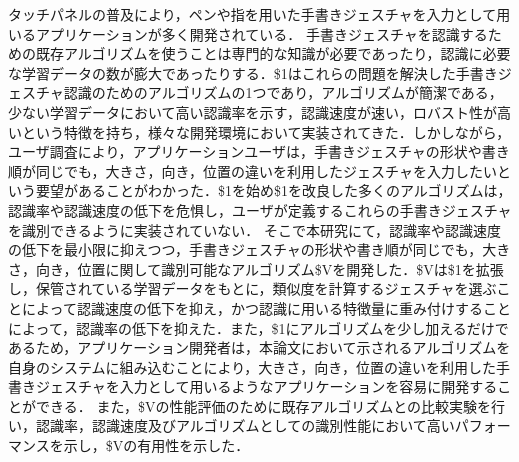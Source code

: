 タッチパネルの普及により，ペンや指を用いた手書きジェスチャを入力として用いるアプリケーションが多く開発されている．
手書きジェスチャを認識するための既存アルゴリズムを使うことは専門的な知識が必要であったり，認識に必要な学習データの数が膨大であったりする．\$1はこれらの問題を解決した手書きジェスチャ認識のためのアルゴリズムの1つであり，アルゴリズムが簡潔である，少ない学習データにおいて高い認識率を示す，認識速度が速い，ロバスト性が高いという特徴を持ち，様々な開発環境において実装されてきた．しかしながら，ユーザ調査により，アプリケーションユーザは，手書きジェスチャの形状や書き順が同じでも，大きさ，向き，位置の違いを利用したジェスチャを入力したいという要望があることがわかった．\$1を始め\$1を改良した多くのアルゴリズムは，認識率や認識速度の低下を危惧し，ユーザが定義するこれらの手書きジェスチャを識別できるように実装されていない．
そこで本研究にて，認識率や認識速度の低下を最小限に抑えつつ，手書きジェスチャの形状や書き順が同じでも，大きさ，向き，位置に関して識別可能なアルゴリズム\$Vを開発した．\$Vは\$1を拡張し，保管されている学習データをもとに，類似度を計算するジェスチャを選ぶことによって認識速度の低下を抑え，かつ認識に用いる特徴量に重み付けすることによって，認識率の低下を抑えた．また，\$1にアルゴリズムを少し加えるだけであるため，アプリケーション開発者は，本論文において示されるアルゴリズムを自身のシステムに組み込むことにより，大きさ，向き，位置の違いを利用した手書きジェスチャを入力として用いるようなアプリケーションを容易に開発することができる．
また，\$Vの性能評価のために既存アルゴリズムとの比較実験を行い，認識率，認識速度及びアルゴリズムとしての識別性能において高いパフォーマンスを示し，\$Vの有用性を示した．